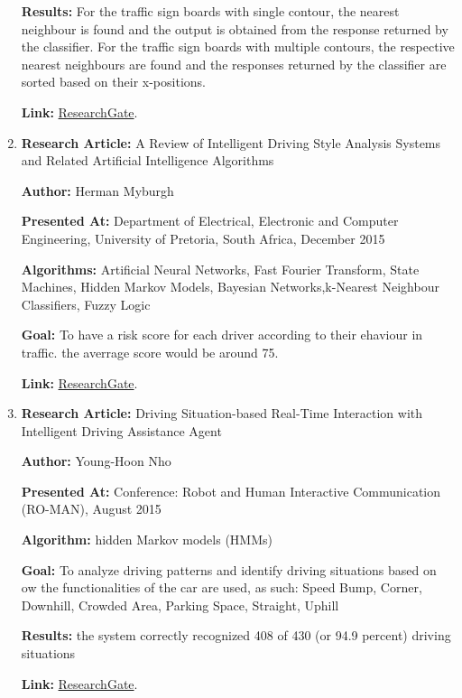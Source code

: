 \documentclass[runningheads,a4paper,11pt]{report}
\begin{document}
\begin{enumerate}
   \textbf{Results: } For the traffic sign boards with single contour, the nearest neighbour is found and the output is
obtained from the response returned by the classifier. For the traffic sign boards with multiple
contours, the respective nearest neighbours are found and the responses returned by the classifier are
sorted based on their x-positions.

    \textbf{Link: } \href{https://www.researchgate.net/publication/321478937_Traffic_signs_recognition_for_driving_assistance}{ResearchGate}.
    
  \item \textbf{Research Article: }A Review of Intelligent Driving Style Analysis
Systems and Related Artificial Intelligence Algorithms
  
  \textbf{Author: } Herman Myburgh
  
  \textbf{Presented At: } Department of Electrical, Electronic and Computer Engineering, University of Pretoria, South Africa, December 2015 
  
  \textbf{Algorithms: } Artificial Neural Networks, Fast Fourier Transform, State Machines, Hidden Markov Models, Bayesian Networks,k-Nearest Neighbour Classifiers, Fuzzy Logic
  
    \textbf{Goal: }To have a risk score for each driver according to their ehaviour in traffic. the averrage score would be around 75.

    \textbf{Link: } \href{https://www.researchgate.net/publication/286509832_A_Review_of_Intelligent_Driving_Style_Analysis_Systems_and_Related_Artificial_Intelligence_Algorithms}{ResearchGate}.
    
    \item \textbf{Research Article: }Driving Situation-based Real-Time Interaction with Intelligent Driving Assistance Agent
  
  \textbf{Author: } Young-Hoon Nho
  
  \textbf{Presented At: } Conference: Robot and Human Interactive Communication (RO-MAN), August 2015
  
  \textbf{Algorithm: }  hidden Markov models (HMMs) 
  
    \textbf{Goal: } To analyze driving patterns and identify driving situations based on ow the functionalities of the car are used, as such: Speed Bump, Corner, Downhill, Crowded Area, Parking Space, Straight, Uphill 

   \textbf{Results: } the system correctly recognized 408 of 430 (or 94.9 percent) driving situations

    \textbf{Link: } \href{https://www.researchgate.net/publication/308025588_Driving_Situation-based_Real-Time_Interaction_with_Intelligent_Driving_Assistance_Agent}{ResearchGate}.
\end{enumerate}
\end{document}
